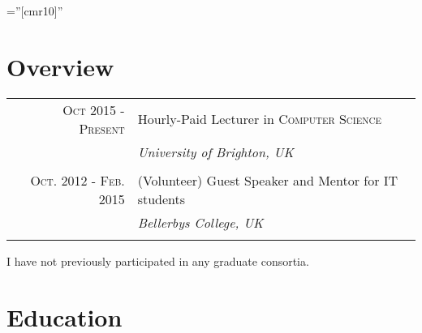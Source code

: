 \documentclass[a4paper,11pt]{article} %
\begin{document}
\pagestyle{empty} %

\font\fb=''[cmr10]'' %


\par{\bigskip\par} %


\section{Overview}

\begin{tabular}{r|p{11cm}}
\textsc{Oct 2015 - Present} & Hourly-Paid Lecturer in \textsc{Computer Science}\\
& \emph{University of Brighton, UK}\\
\multicolumn{2}{c}{} \\


\textsc{Oct. 2012 - Feb. 2015} & (Volunteer) Guest Speaker and Mentor for IT students\\
& \emph{Bellerbys College, UK}\\
\multicolumn{2}{c}{} \\

\end{tabular}

I have not previously participated in any graduate consortia.

\vspace{1cm}


\section{Education}
\end{document}
